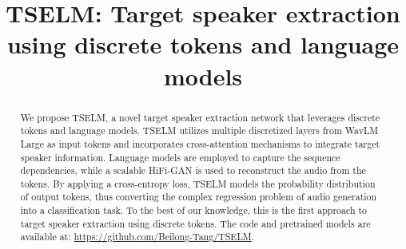 \documentclass[conference]{IEEEtran}
\begin{document}
\title{TSELM: Target speaker extraction using discrete tokens and language models
}

\author{
\and
{}
\and
{}
}

\maketitle

\begin{abstract}
  We propose TSELM, a novel target speaker extraction network that leverages discrete tokens and language models. TSELM utilizes multiple discretized layers from WavLM Large as input tokens and incorporates cross-attention mechanisms to integrate target speaker information. Language models are employed to capture the sequence dependencies, while a scalable HiFi-GAN is used to reconstruct the audio from the tokens. By applying a cross-entropy loss, TSELM models the probability distribution of output tokens, thus converting the complex regression problem of audio generation into a classification task. To the best of our knowledge, this is the first approach to target speaker extraction using discrete tokens.  The code and pretrained models are available at: \href{https://github.com/Beilong-Tang/TSELM}{https://github.com/Beilong-Tang/TSELM}.
\end{abstract}
\end{document}
